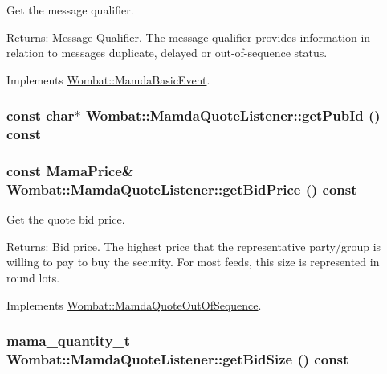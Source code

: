 Get the message qualifier. 

\begin{Desc}
\item[Returns:]Message Qualifier. The message qualifier provides information in relation to messages duplicate, delayed or out-of-sequence status. \end{Desc}


Implements \hyperlink{classWombat_1_1MamdaBasicEvent_675ce8f1de581548426335423d6b3864}{Wombat::Mamda\-Basic\-Event}.\hypertarget{classWombat_1_1MamdaQuoteListener_1ba9fa01139733d0011380af2ae8bd96}{
\subsubsection[getPubId]{\setlength{\rightskip}{0pt plus 5cm}const char$\ast$ Wombat::Mamda\-Quote\-Listener::get\-Pub\-Id () const}}
\label{classWombat_1_1MamdaQuoteListener_1ba9fa01139733d0011380af2ae8bd96}


\hypertarget{classWombat_1_1MamdaQuoteListener_af4b7f010c56303476dc4de64fa0b3f4}{
\subsubsection[getBidPrice]{\setlength{\rightskip}{0pt plus 5cm}const Mama\-Price\& Wombat::Mamda\-Quote\-Listener::get\-Bid\-Price () const}}
\label{classWombat_1_1MamdaQuoteListener_af4b7f010c56303476dc4de64fa0b3f4}


Get the quote bid price. 

\begin{Desc}
\item[Returns:]Bid price. The highest price that the representative party/group is willing to pay to buy the security. For most feeds, this size is represented in round lots. \end{Desc}


Implements \hyperlink{classWombat_1_1MamdaQuoteOutOfSequence_af6014e4342076750ed12bcb4cefe62d}{Wombat::Mamda\-Quote\-Out\-Of\-Sequence}.\hypertarget{classWombat_1_1MamdaQuoteListener_578f45a1ddaa18b8447cda08b943153e}{
\subsubsection[getBidSize]{\setlength{\rightskip}{0pt plus 5cm}mama\_\-quantity\_\-t Wombat::Mamda\-Quote\-Listener::get\-Bid\-Size () const}}
\label{classWombat_1_1MamdaQuoteListener_578f45a1ddaa18b8447cda08b943153e}


